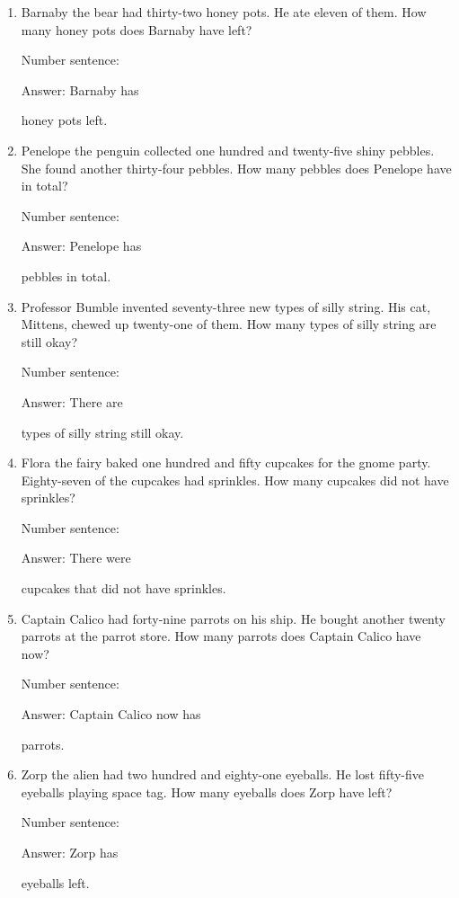 \documentclass{tufte-book}
\begin{document}
\begin{enumerate}

\item
  Barnaby the bear had thirty-two honey pots. He ate eleven of them. How
  many honey pots does Barnaby have left?\medskip\par
  Number sentence:
  \dotfill\medskip\par
  Answer: Barnaby has
  \dotfill\medskip\par\mbox{}\dotfill\medskip\par\mbox{}\dotfill\bigskip
  honey pots left.
\item
  Penelope the penguin collected one hundred and twenty-five shiny
  pebbles. She found another thirty-four pebbles. How many pebbles does
  Penelope have in total?\medskip\par
  Number sentence:
  \dotfill\medskip\par
  Answer: Penelope has
  \dotfill\medskip\par\mbox{}\dotfill\medskip\par\mbox{}\dotfill\bigskip
  pebbles in total.
\item
  Professor Bumble invented seventy-three new types of silly string. His
  cat, Mittens, chewed up twenty-one of them. How many types of silly
  string are still okay?\medskip\par
  Number sentence:
  \dotfill\medskip\par
  Answer: There are
  \dotfill\medskip\par\mbox{}\dotfill\medskip\par\mbox{}\dotfill\bigskip
  types of silly string still okay.
\item
  Flora the fairy baked one hundred and fifty cupcakes for the gnome
  party. Eighty-seven of the cupcakes had sprinkles. How many cupcakes
  did not have sprinkles?\medskip\par
  Number sentence:
  \dotfill\medskip\par
  Answer: There were
  \dotfill\medskip\par\mbox{}\dotfill\medskip\par\mbox{}\dotfill\bigskip
  cupcakes that did not have sprinkles.
\item
  Captain Calico had forty-nine parrots on his ship. He bought another
  twenty parrots at the parrot store. How many parrots does Captain
  Calico have now?\medskip\par
  Number sentence:
  \dotfill\medskip\par
  Answer: Captain Calico now has
  \dotfill\medskip\par\mbox{}\dotfill\medskip\par\mbox{}\dotfill\bigskip
  parrots.
\item
  Zorp the alien had two hundred and eighty-one eyeballs. He lost
  fifty-five eyeballs playing space tag. How many eyeballs does Zorp
  have left?\medskip\par
  Number sentence:
  \dotfill\medskip\par
  Answer: Zorp has
  \dotfill\medskip\par\mbox{}\dotfill\medskip\par\mbox{}\dotfill\bigskip
  eyeballs left.
\end{enumerate}
\end{document}
